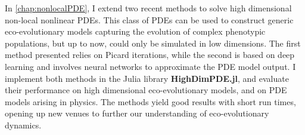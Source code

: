 In \cref{chap:nonlocalPDE}, I extend two recent methods to solve high dimensional non-local nonlinear PDEs. This class of PDEs can be used to construct generic eco-evolutionary models capturing the evolution of complex phenotypic populations, but up to now, could only be simulated in low dimensions. The first method presented relies on Picard iterations, while the second is based on deep learning and involves neural networks to approximate the PDE model output. I implement both methods in the Julia library \textbf{HighDimPDE.jl}, and evaluate their performance on high dimensional eco-evolutionary models, and on PDE models arising in physics. The methods yield good results with short run times, opening up new venues to further our understanding of eco-evolutionary dynamics.

\newpage


